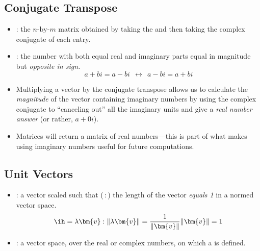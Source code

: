 \begin{itemize}
  \subsection{Conjugate Transpose}\label{Conjugate Transpose}
  \begin{itemize}
    \item {}: the \(n\text{-by-}m\) matrix obtained by taking the \hyperref[Transposition]{} and then taking the complex conjugate of each entry.
    \item {}: the number with both equal real and imaginary parts equal in magnitude but \emph{opposite in sign.}
      \[%
      a+bi = a - bi~~\longleftrightarrow~~a - bi = a + bi
      \]%
      \vspace{-24pt}
    \item Multiplying a vector by the conjugate transpose allows us to calculate the \emph{magnitude} of the vector containing imaginary numbers by using the complex conjugate to ``canceling out'' all the imaginary units and give a \emph{real number answer} (or rather, \(a + 0i\)).
    \item Matrices will return a matrix of real numbers---this is part of what makes using imaginary numbers useful for future computations. 
  \end{itemize} 
  \vspace{12pt}
  \subsection{Unit Vectors}\label{Unit Vectors}
  \begin{itemize}
    \item {}: a vector scaled such that (\,:\,) the length of the vector \emph{equals 1} in a normed vector space.
    \[%
    \ih = \lambda \bm{v} : \| \lambda\bm{v} \| = \frac{1}{\| \bm{v} \|} \| \bm{v} \| = 1
    \]%
    \item {}: a vector space, over the real or complex numbers, on which a \hyperref[Vector Length]{} is defined.
  \end{itemize}
\end{itemize}

